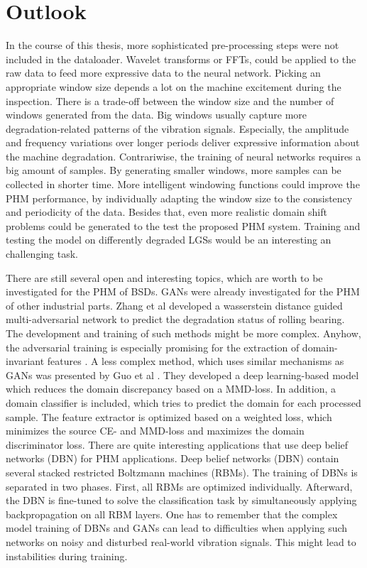 \chapter{Outlook}
In the course of this thesis, more sophisticated pre-processing steps were not included in the dataloader. Wavelet transforms or FFTs, could be applied to the raw data to feed more expressive data to the neural network. Picking an appropriate window size depends a lot on the machine excitement during the inspection. There is a trade-off between the window size and the number of windows generated from the data. Big windows usually capture more degradation-related patterns of the vibration signals. Especially, the amplitude and frequency variations over longer periods deliver expressive information about the machine degradation. Contrariwise, the training of neural networks requires a big amount of samples. By generating smaller windows, more samples can be collected in shorter time. More intelligent windowing functions could improve the PHM performance, by individually adapting the window size to the consistency and periodicity of the data. Besides that, even more realistic domain shift problems could be generated to the test the proposed PHM system. Training and testing the model on differently degraded LGSs would be an interesting an challenging task.

There are still several open and interesting topics, which are worth to be investigated for the PHM of BSDs. GANs were already investigated for the PHM of other industrial parts. Zhang et al \cite{Zhang2019} developed a wasserstein distance guided multi-adversarial network to predict the degradation status of rolling bearing. The development and training of such methods might be more complex. Anyhow, the adversarial training is especially promising for the extraction of domain-invariant features \cite{Zhang2019}. A less complex method, which uses similar mechanisms as GANs was presented by Guo et al \cite{Guo2019}. They developed a deep learning-based model which reduces the domain discrepancy based on a MMD-loss. In addition, a domain classifier is included, which tries to predict the domain for each processed sample. The feature extractor is optimized based on a weighted loss, which minimizes the source CE- and MMD-loss and maximizes the domain discriminator loss. There are quite interesting applications that use deep belief networks (DBN) \cite{ZHAO2019213} for PHM applications. Deep belief networks (DBN) contain several stacked restricted Boltzmann machines (RBMs). The training of DBNs is separated in two phases. First, all RBMs are optimized individually. Afterward, the DBN is fine-tuned to solve the classification task by simultaneously applying backpropagation on all RBM layers. One has to remember that the complex model training of DBNs and GANs can lead to difficulties when applying such networks on noisy and disturbed real-world vibration signals. This might lead to instabilities during training.





